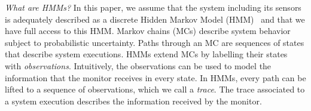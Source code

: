 \documentclass[runningheads]{llncs}
\renewcommand{\paragraph}[1]{\smallskip\noindent\emph{#1}}
\begin{document}
\paragraph{What are HMMs?}
In this paper, we assume that the system including its sensors is adequately described as a discrete Hidden Markov Model (HMM)~\cite{rabinerTutorialHiddenMarkov1989} and that we have full access to this HMM.
Markov chains (MCs) describe system behavior subject to probabilistic uncertainty.
Paths through an MC are sequences of states that describe system executions.
HMMs extend MCs by labelling their states with \emph{observations}.
Intuitively, the observations can be used to model the information that the monitor receives in every state.
In HMMs, every path can be lifted to a sequence of observations, which we call a \emph{trace}.
The trace associated to a system execution describes the information received by the monitor.
\end{document}
